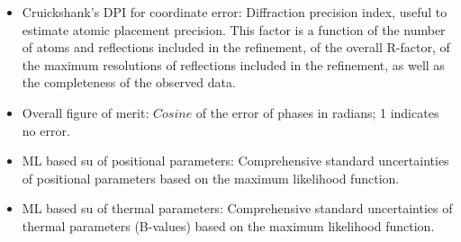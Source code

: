 \begin{itemize}
\begin{itemize}
\begin{itemize}
     \item Cruickshank's DPI for coordinate error: Diffraction precision index, useful to estimate atomic placement precision. This factor is a function of the number of atoms and reflections included in the refinement, of the overall R-factor, of the maximum resolutions of reflections included in the refinement, as well as the completeness of the observed data.
     
     \item Overall figure of merit: $Cosine$ of the error of phases in radians; 1 indicates no error.
     
     \item ML based su of positional parameters: Comprehensive standard uncertainties of positional parameters based on the maximum likelihood function.
     
     \item ML based su of thermal parameters: Comprehensive standard uncertainties of thermal parameters (B-values) based on the maximum likelihood function.
     \end{itemize}
     

\end{itemize}
\end{itemize}
